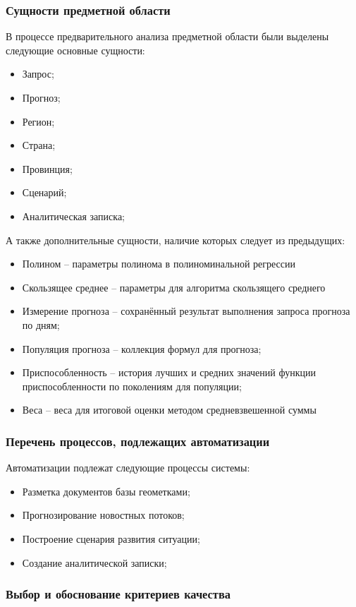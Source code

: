 \clearpage
\subsubsection{Сущности предметной области}

В процессе предварительного анализа предметной области были выделены следующие основные сущности:
\begin{itemize}
\item Запрос;
\item Прогноз;
\item Регион;
\item Страна;
\item Провинция;
\item Сценарий;
\item Аналитическая записка;
\end{itemize}

А также дополнительные сущности, наличие которых следует из предыдущих:
\begin{itemize}
\item Полином -- параметры полинома в полиноминальной регрессии
\item Скользящее среднее -- параметры для алгоритма скользящего среднего
\item Измерение прогноза -- сохранённый результат выполнения запроса прогноза по дням;
\item Популяция прогноза -- коллекция формул для прогноза;
\item Приспособленность -- история лучших и средних значений функции приспособленности по поколениям для популяции;
\item Веса -- веса для итоговой оценки методом средневзвешенной суммы
\end{itemize}

\subsubsection{Перечень процессов, подлежащих автоматизации}
Автоматизации подлежат следующие процессы системы:
\begin{itemize}
\item Разметка документов базы геометками;
\item Прогнозирование новостных потоков;
\item Построение сценария развития ситуации;
\item Создание аналитической записки;
\end{itemize}

\subsubsection{Выбор и обоснование критериев качества}

